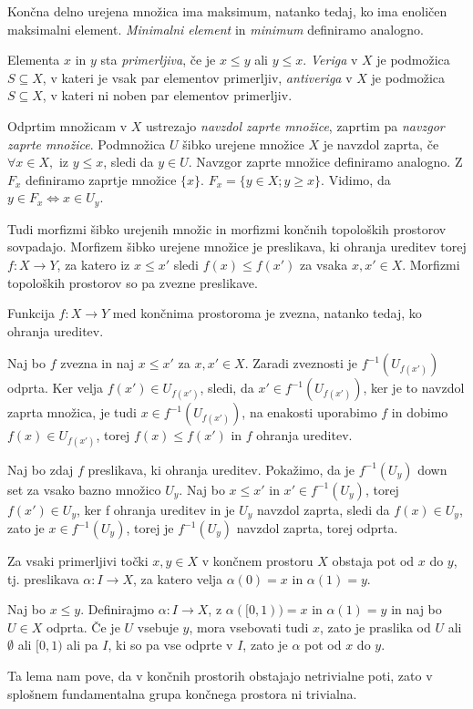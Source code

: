 \documentclass[mat1]{fmfdelo}
\begin{document}
Končna delno urejena množica ima maksimum, natanko tedaj, ko ima enoličen maksimalni element. \textit{Minimalni element} in \textit{minimum} definiramo analogno.

Elementa $x$ in $y$ sta \textit{primerljiva}, če je $x\leq y$ ali $y\leq x$. \textit{Veriga} v $X$ je podmožica $S\subseteq X$, v kateri je vsak par elementov primerljiv, \textit{antiveriga} v $X$ je podmožica $S\subseteq X$, v kateri ni noben par elementov primerljiv. 

Odprtim množicam v $X$ ustrezajo \textit{navzdol zaprte množice}, zaprtim pa \textit{navzgor zaprte množice}. Podmnožica $U$
 šibko urejene množice $X$ je navzdol zaprta, če $\forall x\in X,$ iz $y\leq x$, sledi da $y\in U$. Navzgor zaprte množice definiramo analogno.
Z $F_x$ definiramo zaprtje množice $\{x\}$. $F_x=\{y\in X; y\geq x\}$. Vidimo, da $y\in F_x \Leftrightarrow x\in U_y$.

Tudi morfizmi šibko urejenih množic in morfizmi končnih topoloških prostorov sovpadajo.
  Morfizem šibko urejene množice je preslikava, ki ohranja ureditev torej $f: X\rightarrow Y$, 
  za katero iz $x\leq x'$ sledi $f(x)\leq f(x')$ za vsaka $x,x'\in X$. Morfizmi topoloških prostorov so pa zvezne preslikave.

\begin{trditev}
Funkcija $f:X\rightarrow Y$ med končnima prostoroma je zvezna, natanko tedaj, ko ohranja ureditev.
\end{trditev}

\begin{dokaz}
    Naj bo $f$ zvezna in naj $x\leq x'$ za $x, x' \in X$. Zaradi zveznosti je $f^{-1}(U_{f(x')})$ odprta. Ker velja $f(x')\in U_{f(x')}$, sledi, da $x'\in f^{-1}(U_{f(x')})$, ker je to navzdol zaprta množica, je tudi $x\in f^{-1}(U_{f(x')})$, na enakosti uporabimo $f$ in dobimo $f(x)\in U_{f(x')}$, torej $f(x)\leq f(x')$ in $f$ ohranja ureditev.

    Naj bo zdaj $f$ preslikava, ki ohranja ureditev. Pokažimo, da je $f^{-1}(U_y)$ down set za vsako bazno množico $U_y$. Naj bo $x\leq x'$ in $x'\in f^{-1}(U_y)$, torej $f(x') \in U_y$, ker f ohranja ureditev in je $U_y$ navzdol zaprta, sledi da $f(x)\in U_y$, zato je $x\in f^{-1}(U_y)$, torej je $f^{-1}(U_y)$ navzdol zaprta, torej odprta.


\end{dokaz}


\begin{lema}
    Za vsaki primerljivi točki $x,y\in X$ v končnem prostoru $X$ obstaja pot od $x$ do $y$, tj. preslikava $\alpha: I \rightarrow X$, za katero velja $\alpha(0)=x$ in $\alpha(1)=y$.
\label{lem:pot}
\end{lema}
\begin{dokaz}
    Naj bo $x \leq y$. Definirajmo $\alpha:I\rightarrow X$, z $\alpha([0,1))=x$ in $\alpha(1)=y$ in naj bo $U\in X$ odprta. Če je $U$ vsebuje $y$, mora vsebovati tudi $x$, 
    zato je praslika od $U$ ali $\emptyset$ ali $[0,1)$ ali pa $I$, ki so pa vse odprte v $I$, zato je $\alpha$ pot od $x$ do $y$.
\end{dokaz}
Ta lema nam pove, da v končnih prostorih obstajajo netrivialne poti, zato v splošnem fundamentalna grupa končnega prostora ni trivialna.
\end{document}
